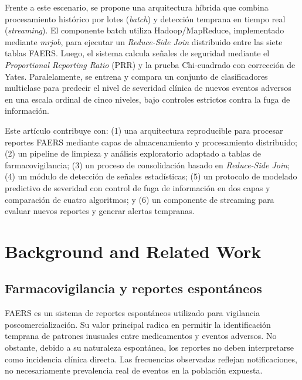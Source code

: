\documentclass[12pt,a4paper]{article}
\begin{document}
Frente a este escenario, se propone una arquitectura híbrida que combina procesamiento histórico por lotes (\textit{batch}) y detección temprana en tiempo real (\textit{streaming}). El componente batch utiliza Hadoop/MapReduce, implementado mediante \textit{mrjob}, para ejecutar un \textit{Reduce-Side Join} distribuido entre las siete tablas FAERS. Luego, el sistema calcula señales de seguridad mediante el \textit{Proportional Reporting Ratio} (PRR) y la prueba Chi-cuadrado con corrección de Yates. Paralelamente, se entrena y compara un conjunto de clasificadores multiclase para predecir el nivel de severidad clínica de nuevos eventos adversos en una escala ordinal de cinco niveles, bajo controles estrictos contra la fuga de información.

Este artículo contribuye con: (1) una arquitectura reproducible para procesar reportes FAERS mediante capas de almacenamiento y procesamiento distribuido; (2) un pipeline de limpieza y análisis exploratorio adaptado a tablas de farmacovigilancia; (3) un proceso de consolidación basado en \textit{Reduce-Side Join}; (4) un módulo de detección de señales estadísticas; (5) un protocolo de modelado predictivo de severidad con control de fuga de información en dos capas y comparación de cuatro algoritmos; y (6) un componente de streaming para evaluar nuevos reportes y generar alertas tempranas.

\section{Background and Related Work}

\subsection{Farmacovigilancia y reportes espontáneos}
FAERS es un sistema de reportes espontáneos utilizado para vigilancia poscomercialización. Su valor principal radica en permitir la identificación temprana de patrones inusuales entre medicamentos y eventos adversos. No obstante, debido a su naturaleza espontánea, los reportes no deben interpretarse como incidencia clínica directa. Las frecuencias observadas reflejan notificaciones, no necesariamente prevalencia real de eventos en la población expuesta.
\end{document}
